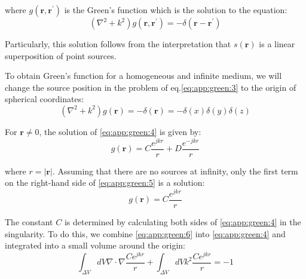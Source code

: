 			\noindent where $g(\mathbf{r}, \mathbf{r^\prime})$ is the Green's function which is the solution to the equation:
			\begin{equation}
					(\nabla^2+k^2)g(\mathbf{r},\mathbf{r^\prime}) = -\delta(\mathbf{r}-\mathbf{r^\prime}) \label{eq:app:green:3}
			\end{equation}
	
			Particularly, this solution follows from the interpretation that $s(\mathbf{r})$ is a linear superposition of point sources.

			To obtain Green's function for a homogeneous and infinite medium, we will change the source position in the problem of eq.\eqref{eq:app:green:3} to the origin of spherical coordinates:
			\begin{equation}
				(\nabla^2+k^2)g(\mathbf{r}) = -\delta(\mathbf{r}) = -\delta(x)\delta(y)\delta(z) \label{eq:app:green:4}
			\end{equation}
		
			For $\mathbf{r}\neq0$, the solution of \eqref{eq:app:green:4} is given by:
			\begin{equation}
				g(\mathbf{r}) = C\frac{e^{jkr}}{r} + D\frac{e^{-jkr}}{r} \label{eq:app:green:5}
				\end{equation}
   
   			\noindent where $r = |\mathbf{r}|$. Assuming that there are no sources at infinity, only the first term on the right-hand side of \eqref{eq:app:green:5} is a solution:
   			\begin{equation}
   				g(\mathbf{r}) = C\frac{e^{jkr}}{r} \label{eq:app:green:6}
   			\end{equation}

			The constant $C$ is determined by calculating both sides of \eqref{eq:app:green:4} in the singularity. To do this, we combine \eqref{eq:app:green:6} into \eqref{eq:app:green:4} and integrated into a small volume around the origin:
			\begin{equation}
				\int_{\Delta V} dV \nabla\cdot\nabla\frac{Ce^{jkr}}{r} + \int_{\Delta V} dVk^2\frac{Ce^{jkr}}{r} = -1 \label{eq:app:green:7}
			\end{equation}
   
